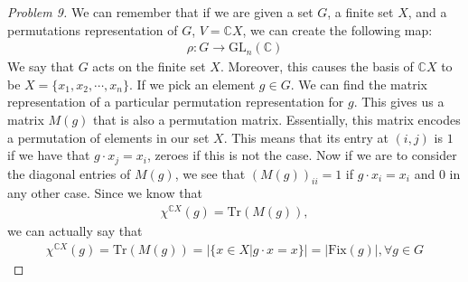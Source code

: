 \documentclass[titlepage]{article}
\theoremstyle{plain}
\theoremstyle{definition}
\theoremstyle{remark}
\theoremstyle{exercise-style}
\numberwithin{equation}{section}
\numberwithin{theorem}{section}
\numberwithin{remark}{section}
\begin{document}
\begin{proof}[Problem 9]
    We can remember that if we are given a set $G$, a finite set $X$, and a permutations representation of $G$, $V = \mathbb{C}X$, we can create the following map:
    \begin{align}
        \rho :G \to \mathrm{GL}_n(\mathbb{C})
    \end{align}
    We say that $G$ acts on the finite set $X$. Moreover, this causes the basis of $\mathbb{C}X$ to be $X = \{ x_1, x_2, \cdots, x_n \}$. If we pick an element $g \in G$. We can find the matrix representation of a particular permutation representation for $g$. This gives us a matrix $M(g)$ that is also a permutation matrix. Essentially, this matrix encodes a permutation of elements in our set $X$. This means that its entry at $(i,j)$ is $1$ if we have that $g \cdot x_j = x_i$, zeroes if this is not the case. Now if we are to consider the diagonal entries of $M(g)$, we see that $(M(g))_{ii} = 1$ if $g \cdot x_i = x_i$ and $0$ in any other case. Since we know that
    \begin{align}
        \chi^{\mathbb{C}X}(g) = \mathrm{Tr}(M(g)),
    \end{align}
    we can actually say that 
    \begin{align}
        \chi^{\mathbb{C}X}(g) = \mathrm{Tr}(M(g)) = | \{ x \in X |g \cdot x = x \} | = |\mathrm{Fix}(g)|, \forall g \in G
    \end{align}
\end{proof}
\end{document}
